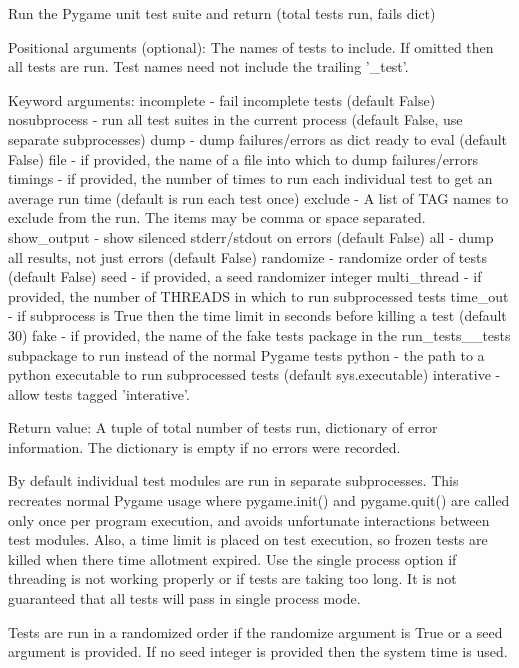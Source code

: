 \begin{DoxyVerb}Run the Pygame unit test suite and return (total tests run, fails dict)

Positional arguments (optional):
The names of tests to include. If omitted then all tests are run. Test
names need not include the trailing '_test'.

Keyword arguments:
incomplete - fail incomplete tests (default False)
nosubprocess - run all test suites in the current process
               (default False, use separate subprocesses)
dump - dump failures/errors as dict ready to eval (default False)
file - if provided, the name of a file into which to dump failures/errors
timings - if provided, the number of times to run each individual test to
          get an average run time (default is run each test once)
exclude - A list of TAG names to exclude from the run. The items may be
          comma or space separated.
show_output - show silenced stderr/stdout on errors (default False)
all - dump all results, not just errors (default False)
randomize - randomize order of tests (default False)
seed - if provided, a seed randomizer integer
multi_thread - if provided, the number of THREADS in which to run
               subprocessed tests
time_out - if subprocess is True then the time limit in seconds before
           killing a test (default 30)
fake - if provided, the name of the fake tests package in the
       run_tests__tests subpackage to run instead of the normal
       Pygame tests
python - the path to a python executable to run subprocessed tests
         (default sys.executable)
interative - allow tests tagged 'interative'.

Return value:
A tuple of total number of tests run, dictionary of error information. The
dictionary is empty if no errors were recorded.

By default individual test modules are run in separate subprocesses. This
recreates normal Pygame usage where pygame.init() and pygame.quit() are
called only once per program execution, and avoids unfortunate
interactions between test modules. Also, a time limit is placed on test
execution, so frozen tests are killed when there time allotment expired.
Use the single process option if threading is not working properly or if
tests are taking too long. It is not guaranteed that all tests will pass
in single process mode.

Tests are run in a randomized order if the randomize argument is True or a
seed argument is provided. If no seed integer is provided then the system
time is used.


\end{DoxyVerb}
